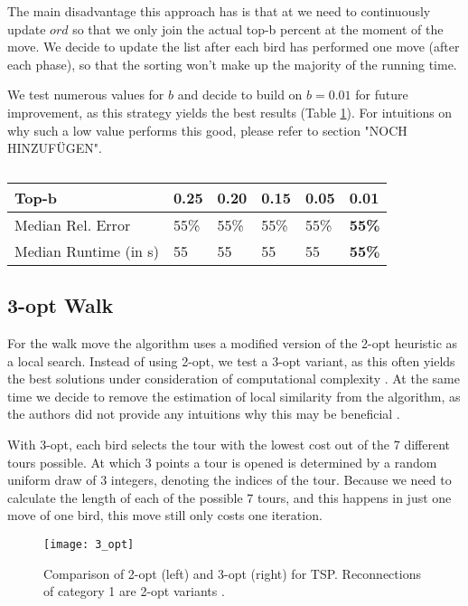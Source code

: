 The main disadvantage this approach has is that at we need to continuously update $ord$ so that we only join the actual top-b percent at the moment of the move. We decide to update the list after each bird has performed one move (after each phase), so that the sorting won't make up the majority of the running time.

We test numerous values for $b$ and decide to build on $b=0.01$ for future improvement, as this strategy yields the best results (Table \ref{top_b_performance}). For intuitions on why such a low value performs this good, please refer to section "NOCH HINZUFÜGEN".

\begin{table}[h!]
\centering
\begin{tabular}{ |p{2.5cm}||p{0.75cm}|p{0.75cm}|p{0.75cm}|p{0.75cm}|p{0.75cm}|  }
 \hline
 Top-b& 0.25 & 0.20 & 0.15 & 0.05 & \textbf{0.01}\\
 \hline
 Median Rel. Error & 55\% & 55\% &  55\% & 55\% & \textbf{55\%}\\
 \hline
 Median Runtime (in s) & 55 & 55 &  55 & 55 & \textbf{55\%}\\
 \hline
\end{tabular}
\caption{}
\label{top_b_performance}
\end{table}

\subsection{3-opt Walk}

For the walk move the algorithm uses a modified version of the 2-opt heuristic as a local search. Instead of using 2-opt, we test a 3-opt variant, as this often yields the best solutions under consideration of computational complexity \cite{lin}. At the same time we decide to remove the estimation of local similarity from the algorithm, as the authors did not provide any intuitions why this may be beneficial \cite{afb}.

With 3-opt, each bird selects the tour with the lowest cost out of the 7 different tours possible. At which 3 points a tour is opened is determined by a random uniform draw of 3 integers, denoting the indices of the tour. Because we need to calculate the length of each of the possible 7 tours, and this happens in just one move of one bird, this move still only costs one iteration.

\begin{figure}[htbp]
\centerline{\texttt{[image: 3\_opt]}}
\caption{Comparison of 2-opt (left) and 3-opt (right) for TSP. Reconnections of category 1 are 2-opt variants \cite{3_opt}.}
\label{3_opt}
\end{figure}

